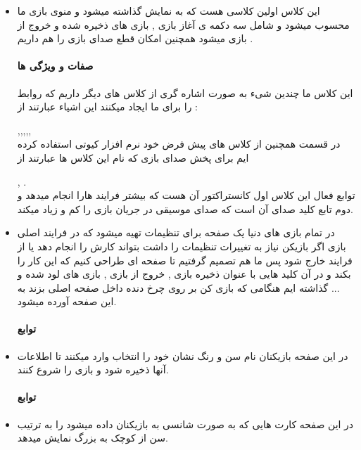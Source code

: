 \documentclass[pdf,titlepage,a4paper]{report}
\begin{document}
\begin{itemize}
		\item {}  این کلاس اولین کلاسی هست که به نمایش گذاشته میشود و منوی بازی ما محسوب میشود و شامل سه دکمه ی آغاز بازی , بازی های ذخیره شده و خروج از بازی میشود همچنین امکان قطع صدای بازی را هم داریم .\\
		\paragraph{صفات و ویژگی ها} 
         این کلاس ما چندین شیء به صورت اشاره گری از کلاس های دیگر داریم که روابط را برای ما ایجاد میکنند این اشیاء عبارتند از :

		,,,,, \\ در قسمت
		همچنین از کلاس های پیش فرض خود نرم افزار کیوتی استفاده کرده ایم برای پخش صدای بازی که نام این کلاس ها عبارتند از 
		
		,  . \\
		 توابع فعال این کلاس اول کانستراکتور آن هست که بیشتر فرایند هارا انجام میدهد و دوم تابع کلید صدای آن است که صدای موسیقی در جریان بازی را کم و زیاد میکند.\\
		
		\item {}  در تمام بازی های دنیا یک صفحه برای تنظیمات تهیه میشود که در فرایند اصلی بازی اگر بازیکن نیاز به تغییرات تنظیمات را داشت بتواند کارش را انجام دهد یا از فرایند خارج شود پس ما هم تصمیم گرفتیم تا صفحه ای طراحی کنیم که این کار را بکند و در آن کلید هایی با عنوان ذخیره بازی , خروج از بازی ,  بازی های لود شده و ... گذاشته ایم هنگامی که بازی کن بر روی چرخ دنده داخل صفحه اصلی بزند به این صفحه آورده میشود. \\
		\paragraph{توابع} 

		\item {}   در این صفحه بازیکنان نام سن و رنگ نشان خود را انتخاب وارد میکنند تا اطلاعات آنها ذخیره شود و بازی را شروع کنند.\\
		\paragraph{توابع} 

		\item {}  در این صفحه کارت هایی که به صورت شانسی به بازیکنان داده میشود را به ترتیب سن از کوچک به بزرگ نمایش میدهد.\\

\end{itemize}
\end{document}

